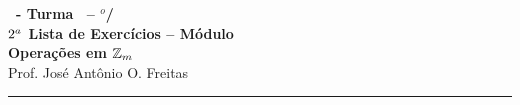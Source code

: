 \documentclass[12pt]{exam}
\begin{document}
    \begin{center}
    {\Large\bf \disciplina\ - Turma \turma\ -- \semestre$^{o}$/\ano} \\ \vspace{9pt} {\large\bf
        $2^a$ Lista de Exercícios -- Módulo \numeromodulo\\ Operações em $\mathbb{Z}_m$}\\ \vspace{9pt} Prof. José Antônio O. Freitas
    \end{center}
    \hrule

    \vspace{.6cm}
\end{document}
